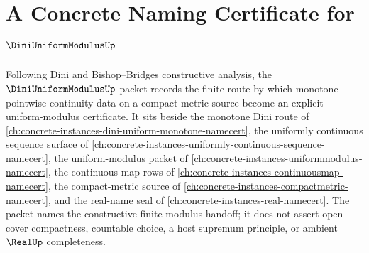 \chapter{A Concrete Naming Certificate for $\DiniUniformModulusUp$}
\label{ch:concrete-instances-dini-uniform-modulus-namecert}

Following Dini and Bishop--Bridges constructive analysis, the $\DiniUniformModulusUp$ packet records the finite route by which monotone pointwise continuity data on a compact metric source become an explicit uniform-modulus certificate. It sits beside the monotone Dini route of \autoref{ch:concrete-instances-dini-uniform-monotone-namecert}, the uniformly continuous sequence surface of \autoref{ch:concrete-instances-uniformly-continuous-sequence-namecert}, the uniform-modulus packet of \autoref{ch:concrete-instances-uniformmodulus-namecert}, the continuous-map rows of \autoref{ch:concrete-instances-continuousmap-namecert}, the compact-metric source of \autoref{ch:concrete-instances-compactmetric-namecert}, and the real-name seal of \autoref{ch:concrete-instances-real-namecert}. The packet names the constructive finite modulus handoff; it does not assert open-cover compactness, countable choice, a host supremum principle, or ambient $\RealUp$ completeness.

